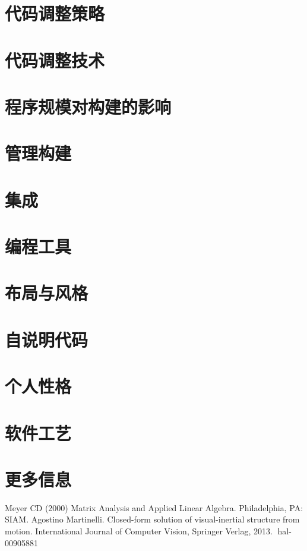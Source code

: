 \documentclass{article}
\begin{document}
\section{代码调整策略}

\section{代码调整技术}

\section{程序规模对构建的影响}

\section{管理构建}

\section{集成}

\section{编程工具}

\section{布局与风格}

\section{自说明代码}

\section{个人性格}

\section{软件工艺}

\section{更多信息}


\begin{thebibliography}{99}  
    Meyer CD (2000) Matrix Analysis and Applied Linear Algebra. Philadelphia, PA: SIAM.
     Agostino Martinelli. Closed-form solution of visual-inertial structure from motion. International
    Journal of Computer Vision, Springer Verlag, 2013. ￿hal-00905881
\end{thebibliography}
\end{document}
